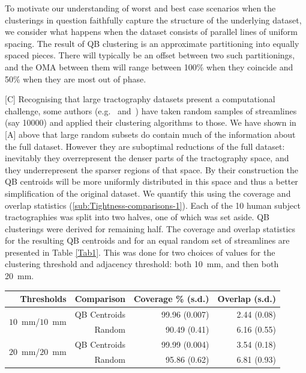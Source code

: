 \documentclass{bioinfo}
\begin{document}
To motivate our understanding of worst and best case scenarios when the
clusterings in question faithfully capture the structure of the
underlying dataset, we consider what happens when the dataset consists
of parallel lines of uniform spacing. The result of QB clustering is an
approximate partitioning into equally spaced pieces. There will
typically be an offset between two such partitionings, and the OMA between
them will range between 100\% when they coincide and 50\% when they are
most out of phase. 

[C] Recognising that large tractography datasets present a computational
challenge, some authors (e.g.~\citet{ODonnell_IEEETMI07}
and~\citet{Visser2010}) have taken random samples of streamlines (say
\num{10000}) and applied their clustering algorithms to those. We have
shown in [A] above that large random subsets do contain much of the
information about the full dataset. However they are suboptimal
reductions of the full dataset: inevitably they overrepresent the denser
parts of the tractography space, and they underrepresent the sparser
regions of that space. By their construction the QB centroids will be
more uniformly distributed in this space and thus a better simplification
of the original dataset. We quantify this using the coverage and overlap
statistics (\ref{sub:Tightness-comparisons-1}). Each of the 10 human
subject tractographies was split into two halves, one of which was set
aside. QB clusterings were derived for remaining half. The coverage and
overlap statistics for the resulting QB centroids and for an equal
random set of streamlines are presented in Table \ref{Tab1}. This was
done for two choices of values for the clustering threshold and
adjacency threshold: both 10~mm, and then both 20~mm.


\begin{table}[th]
{\begin{tabular}{rrrr}
Thresholds & Comparison & Coverage \% (s.d.) & Overlap (s.d.) \\
\hline
\multirow{2}{*}{$10$~mm/$10$~mm} & QB Centroids & 99.96 (0.007) & 2.44 (0.08)\\   
& Random & 90.49 (0.41) & 6.16 (0.55)\\   
\hline
\multirow{2}{*}{$20$~mm/$20$~mm} & QB Centroids & 99.99 (0.004) & 3.54 (0.18)\\   
& Random & 95.86 (0.62) & 6.81 (0.93)\\   
\hline   
\end{tabular}}{}
\end{table}
\end{document}
